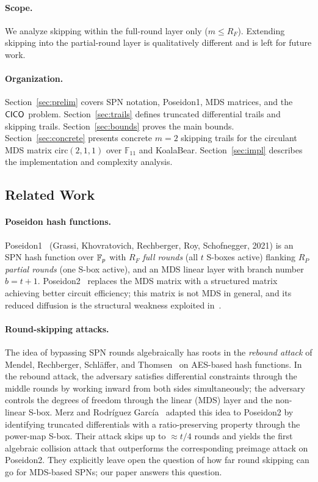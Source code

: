 \documentclass[11pt]{article}
\begin{document}
\paragraph{Scope.}
We analyze skipping within the full-round layer only ($m \leq R_F$). Extending skipping into the partial-round layer is qualitatively different and is left for future work.

\paragraph{Organization.}
Section~\ref{sec:prelim} covers SPN notation, Poseidon1, MDS matrices, and the $\mathsf{CICO}$ problem.
Section~\ref{sec:trails} defines truncated differential trails and skipping trails.
Section~\ref{sec:bounds} proves the main bounds.
Section~\ref{sec:concrete} presents concrete $m=2$ skipping trails for the circulant MDS matrix $\mathrm{circ}(2,1,1)$ over $\mathbb{F}_{11}$ and KoalaBear.
Section~\ref{sec:impl} describes the implementation and complexity analysis.

\subsection{Related Work}
\label{sec:related}

\paragraph{Poseidon hash functions.}
Poseidon1~\cite{poseidon} (Grassi, Khovratovich, Rechberger, Roy, Schofnegger, 2021) is an SPN hash function over $\mathbb{F}_p$ with $R_F$ \emph{full rounds} (all $t$ S-boxes active) flanking $R_P$ \emph{partial rounds} (one S-box active), and an MDS linear layer with branch number $b = t+1$. Poseidon2~\cite{poseidon2} replaces the MDS matrix with a structured matrix achieving better circuit efficiency; this matrix is not MDS in general, and its reduced diffusion is the structural weakness exploited in~\cite{skip2026}.

\paragraph{Round-skipping attacks.}
The idea of bypassing SPN rounds algebraically has roots in the \emph{rebound attack} of Mendel, Rechberger, Schl{\"a}ffer, and Thomsen~\cite{rebound} on AES-based hash functions. In the rebound attack, the adversary satisfies differential constraints through the middle rounds by working inward from both sides simultaneously; the adversary controls the degrees of freedom through the linear (MDS) layer and the non-linear S-box.
Merz and Rodr{\'{i}}guez Garc{\'{i}}a~\cite{skip2026} adapted this idea to Poseidon2 by identifying truncated differentials with a ratio-preserving property through the power-map S-box. Their attack skips up to $\approx t/4$ rounds and yields the first algebraic collision attack that outperforms the corresponding preimage attack on Poseidon2. They explicitly leave open the question of how far round skipping can go for MDS-based SPNs; our paper answers this question.
\end{document}
